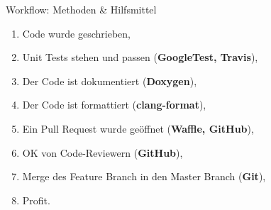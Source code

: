 \begin{slide}{Workflow: Methoden \& Hilfsmittel}

  \small
  \begin{enumerate}
    \item<3-> Code wurde geschrieben,
    \item<4-> Unit Tests stehen und passen (\textbf{GoogleTest, Travis}),
    \item<5-> Der Code ist dokumentiert (\textbf{Doxygen}),
    \item<6-> Der Code ist formattiert (\textbf{clang-format}),
    \item<7-> Ein Pull Request wurde ge\"{o}ffnet (\textbf{Waffle, GitHub}),
    \item<8-> OK von Code-Reviewern (\textbf{GitHub}),
    \item<9-> Merge des Feature Branch in den Master Branch (\textbf{Git}),
    \item<10-> Profit.
  \end{enumerate}
\end{slide}
